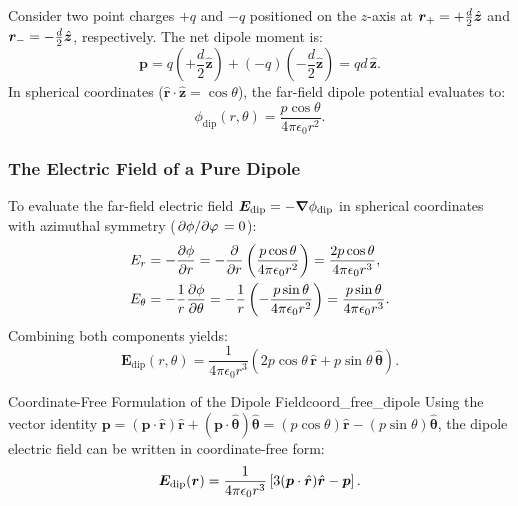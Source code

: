 \begin{example}
Consider two point charges \(+q\) and \(-q\) positioned on the \(z\)-axis at \(\bm{r}_+ = +\frac{d}{2}\hat{\bm{z}}\) and \(\bm{r}_- = -\frac{d}{2}\hat{\bm{z}}\), respectively. The net dipole moment is:
\begin{equation}
    \bm{p} = q\left(+\frac{d}{2}\hat{\bm{z}}\right) + (-q)\left(-\frac{d}{2}\hat{\bm{z}}\right) = q d\,\hat{\bm{z}}.
\end{equation}
In spherical coordinates (\(\hat{\bm{r}}\cdot\hat{\bm{z}} = \cos\theta\)), the far-field dipole potential evaluates to:
\begin{equation}
    \phi_{\text{dip}}(r, \theta) = \frac{p\cos\theta}{4\pi\epsilon_0 r^2}.
\end{equation}
\end{example}

\subsubsection{The Electric Field of a Pure Dipole}

To evaluate the far-field electric field \(\bm{E}_{\text{dip}} = -\grad \phi_{\text{dip}}\) in spherical coordinates with azimuthal symmetry (\(\pdv*{\phi}{\varphi} = 0\)):
\begin{align}
    E_r &= -\pdv{\phi}{r} = -\pdv{}{r}\left(\frac{p\cos\theta}{4\pi\epsilon_0 r^2}\right) = \frac{2p\cos\theta}{4\pi\epsilon_0 r^3}, \\
    E_\theta &= -\frac{1}{r}\pdv{\phi}{\theta} = -\frac{1}{r}\left(-\frac{p\sin\theta}{4\pi\epsilon_0 r^2}\right) = \frac{p\sin\theta}{4\pi\epsilon_0 r^3}.
\end{align}
Combining both components yields:
\begin{equation}
    \bm{E}_{\text{dip}}(r, \theta) = \frac{1}{4\pi\epsilon_0 r^3}\left(2p\cos\theta\,\hat{\bm{r}} + p\sin\theta\,\hat{\bm{\theta}}\right).
\end{equation}

\begin{proposition}{Coordinate-Free Formulation of the Dipole Field}{coord_free_dipole}
Using the vector identity \(\bm{p} = (\bm{p}\cdot\hat{\bm{r}})\hat{\bm{r}} + (\bm{p}\cdot\hat{\bm{\theta}})\hat{\bm{\theta}} = (p\cos\theta)\hat{\bm{r}} - (p\sin\theta)\hat{\bm{\theta}}\), the dipole electric field can be written in coordinate-free form:
\begin{equation}
    \bm{E}_{\text{dip}}(\bm{r}) = \frac{1}{4\pi\epsilon_0 r^3}\left[ 3(\bm{p}\cdot\hat{\bm{r}})\hat{\bm{r}} - \bm{p} \right].
\end{equation}
\end{proposition}


